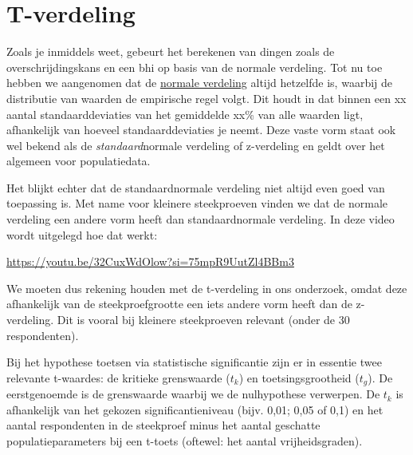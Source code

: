 \documentclass[
  letterpaper,
  DIV=11,
  numbers=noendperiod]{scrreprt}
\begin{document}
\section{T-verdeling}\label{t-verdeling}

Zoals je inmiddels weet, gebeurt het berekenen van dingen zoals de
overschrijdingskans en een bhi op basis van de normale verdeling. Tot nu
toe hebben we aangenomen dat de \hyperref[sec-normaleverdeling]{normale
verdeling} altijd hetzelfde is, waarbij de distributie van waarden de
empirische regel volgt. Dit houdt in dat binnen een xx aantal
standaarddeviaties van het gemiddelde xx\% van alle waarden ligt,
afhankelijk van hoeveel standaarddeviaties je neemt. Deze vaste vorm
staat ook wel bekend als de \emph{standaard}normale verdeling of
z-verdeling en geldt over het algemeen voor populatiedata.

Het blijkt echter dat de standaardnormale verdeling niet altijd even
goed van toepassing is. Met name voor kleinere steekproeven vinden we
dat de normale verdeling een andere vorm heeft dan standaardnormale
verdeling. In deze video wordt uitgelegd hoe dat werkt:

\url{https://youtu.be/32CuxWdOlow?si=75mpR9UutZl4BBm3}

We moeten dus rekening houden met de t-verdeling in ons onderzoek, omdat
deze afhankelijk van de steekproefgrootte een iets andere vorm heeft dan
de z-verdeling. Dit is vooral bij kleinere steekproeven relevant (onder
de 30 respondenten).

Bij het hypothese toetsen via statistische significantie zijn er in
essentie twee relevante t-waardes: de kritieke grenswaarde (\(t_k\)) en
toetsingsgrootheid (\(t_g\)). De eerstgenoemde is de grenswaarde waarbij
we de nulhypothese verwerpen. De \(t_k\) is afhankelijk van het gekozen
significantieniveau (bijv. 0,01; 0,05 of 0,1) en het aantal respondenten
in de steekproef minus het aantal geschatte populatieparameters bij een
t-toets (oftewel: het aantal vrijheidsgraden).
\end{document}
